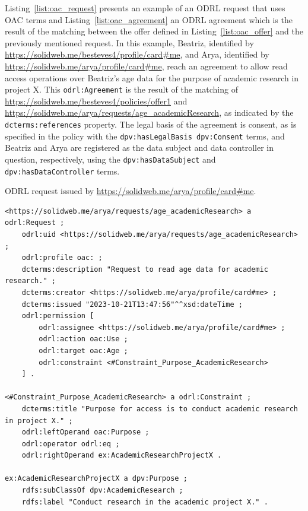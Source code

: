Listing~\ref{list:oac_request} presents an example of an ODRL request that uses OAC terms and Listing~\ref{list:oac_agreement} an ODRL agreement which is the result of the matching between the offer defined in Listing~\ref{list:oac_offer} and the previously mentioned request.
In this example, Beatriz, identified by \url{https://solidweb.me/besteves4/profile/card#me}, and Arya, identified by \url{https://solidweb.me/arya/profile/card#me}, reach an agreement to allow read access operations over Beatriz's age data for the purpose of academic research in project X.
This \texttt{odrl:Agreement} is the result of the matching of \url{https://solidweb.me/besteves4/policies/offer1} and \url{https://solidweb.me/arya/requests/age_academicResearch}, as indicated by the \texttt{dcterms:references} property.
The legal basis of the agreement is consent, as is specified in the policy with the \texttt{dpv:hasLegalBasis dpv:Consent} terms, and Beatriz and Arya are registered as the data subject and data controller in question, respectively, using the \texttt{dpv:hasDataSubject} and \texttt{dpv:hasDataController} terms.

\begin{listing}[ht]
\caption{ODRL request issued by \url{https://solidweb.me/arya/profile/card\#me}.}
\label{list:oac_request}
\begin{verbatim}
<https://solidweb.me/arya/requests/age_academicResearch> a odrl:Request ;
    odrl:uid <https://solidweb.me/arya/requests/age_academicResearch> ;
    odrl:profile oac: ;
    dcterms:description "Request to read age data for academic research." ;
    dcterms:creator <https://solidweb.me/arya/profile/card#me> ;
    dcterms:issued "2023-10-21T13:47:56"^^xsd:dateTime ;
    odrl:permission [
        odrl:assignee <https://solidweb.me/arya/profile/card#me> ;
        odrl:action oac:Use ;
        odrl:target oac:Age ;
        odrl:constraint <#Constraint_Purpose_AcademicResearch>
    ] .

<#Constraint_Purpose_AcademicResearch> a odrl:Constraint ;
    dcterms:title "Purpose for access is to conduct academic research in project X." ;
    odrl:leftOperand oac:Purpose ;
    odrl:operator odrl:eq ;
    odrl:rightOperand ex:AcademicResearchProjectX .

ex:AcademicResearchProjectX a dpv:Purpose ;
    rdfs:subClassOf dpv:AcademicResearch ;
    rdfs:label "Conduct research in the academic project X." .
\end{verbatim}
\end{listing}

